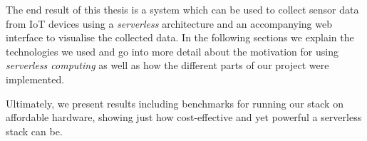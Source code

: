 The end result of this thesis is a system which can be used to collect sensor data from IoT devices
using a \textit{serverless} architecture and an accompanying web interface to visualise the
collected data. In the following sections we explain the technologies we used and go into more detail about the motivation for using \textit{serverless computing} as well as how the
different parts of our project were implemented.

Ultimately, we present results including benchmarks for running our stack on affordable hardware,
showing just how cost-effective and yet powerful a serverless stack can be.
